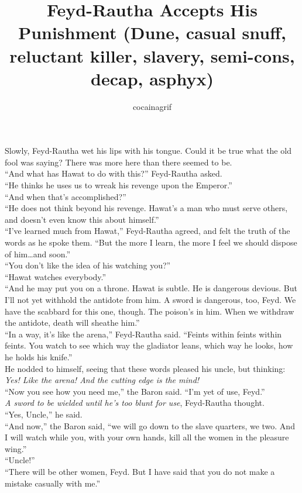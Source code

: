 \documentclass[12pt,letterpaper,draft]{memoir}
\author{cocainagrif}
\title{Feyd-Rautha Accepts His Punishment (Dune, casual snuff, reluctant killer, slavery, semi-cons, decap, asphyx)}
\date{}
\begin{document}
\maketitle


Slowly, Feyd-Rautha wet his lips with his tongue. Could it be true what the old fool was saying? There was more here than there seemed to be.\\
“And what has Hawat to do with this?” Feyd-Rautha asked.\\
“He thinks he uses us to wreak his revenge upon the Emperor.”\\
“And when that’s accomplished?”\\
“He does not think beyond his revenge. Hawat’s a man who must serve others, and doesn’t even know this about himself.”\\
“I’ve learned much from Hawat,” Feyd-Rautha agreed, and felt the truth of the words as he spoke them. “But the more I learn, the more I feel we should dispose of him\ldots and  soon.”\\
“You don’t like the idea of his watching you?”\\
“Hawat watches everybody.”\\
“And he may put you on a throne. Hawat is subtle. He is dangerous 
devious. But I’ll not yet withhold the antidote from him. A sword is dangerous, too, Feyd. We have the scabbard for this one, though. The poison’s in him. When we withdraw the antidote, death will sheathe him.”\\
“In a way, it’s like the arena,” Feyd-Rautha said. “Feints within feints within feints. You watch to see which way the gladiator leans, which way he looks, how he holds his knife.”\\
He nodded to himself, seeing that these words pleased his uncle, but thinking: \textit{Yes! Like the arena! And the cutting edge is the mind!}\\
“Now you see how you need me,” the Baron said. “I’m yet of use, Feyd.”\\
\textit{A sword to be wielded until he’s too blunt for use}, Feyd-Rautha thought.\\
“Yes, Uncle,” he said.\\
“And now,” the Baron said, “we will go down to the slave quarters, we two. And I will watch while you, with your own hands, kill all the women in the pleasure wing.”\\
“Uncle!”\\
“There will be other women, Feyd. But I have said that you do not make a mistake casually with me.”\\
\end{document}
